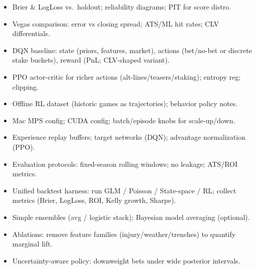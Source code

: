 \begin{itemize}
  \item {} Brier \& LogLoss vs.\ holdout; reliability diagrams; PIT for score distro.
  \item {} Vegas comparison: error vs closing spread; ATS/ML hit rates; CLV differentials.
\end{itemize}

\begin{itemize}
  \item {} DQN baseline: state (priors, features, market), actions (bet/no-bet or discrete stake buckets), reward (PnL; CLV-shaped variant).
  \item {} PPO actor-critic for richer actions (alt-lines/teasers/staking); entropy reg; clipping.
  \item {} Offline RL dataset (historic games as trajectories); behavior policy notes.
\end{itemize}

\begin{itemize}
  \item {} Mac MPS config; CUDA config; batch/episode knobs for scale-up/down.
  \item {} Experience replay buffers; target networks (DQN); advantage normalization (PPO).
  \item {} Evaluation protocols: fixed-season rolling windows; no leakage; ATS/ROI metrics.
\end{itemize}

\begin{itemize}
  \item {} Unified backtest harness: run GLM / Poisson / State-space / RL; collect metrics (Brier, LogLoss, ROI, Kelly growth, Sharpe).
  \item {} Simple ensembles (avg / logistic stack); Bayesian model averaging (optional).
  \item {} Ablations: remove feature families (injury/weather/trenches) to quantify marginal lift.
\end{itemize}

\begin{itemize}
  \item {} Uncertainty-aware policy: downweight bets under wide posterior intervals.
\end{itemize}


